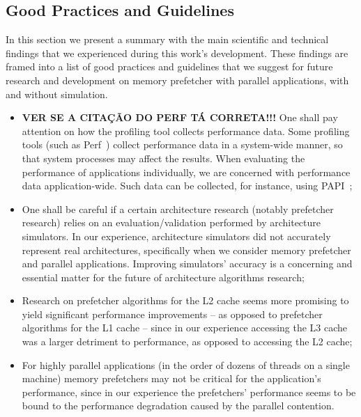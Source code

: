 \documentclass[AMA,final,STIX1COL]{WileyNJD-v2}
\begin{document}
\subsection{Good Practices and Guidelines}
In this section we present a summary with the main scientific and technical findings that we experienced during this work's development. These findings are framed into a list of good practices and guidelines that we suggest for future research and development on memory prefetcher with parallel applications, with and without simulation.

\begin{itemize}
    \item \textbf{VER SE A CITAÇÃO DO PERF TÁ CORRETA!!!} One shall pay attention on how the profiling tool collects performance data. Some profiling tools (such as Perf~\cite{de2010new}) collect performance data in a system-wide manner, so that system processes may affect the results. When evaluating the performance of applications individually, we are concerned with performance data application-wide. Such data can be collected, for instance, using PAPI~\cite{terpstra2010papi};
    
    \item One shall be careful if a certain architecture research (notably prefetcher research) relies on an evaluation/validation performed by architecture simulators. In our experience, architecture simulators did not accurately represent real architectures, specifically when we consider memory prefetcher and parallel applications. Improving simulators' accuracy is a concerning and essential matter for the future of architecture algorithms research;
    
    \item Research on prefetcher algorithms for the L2 cache seems more promising to yield significant performance improvements -- as opposed to prefetcher algorithms for the L1 cache -- since in our experience accessing the L3 cache was a larger detriment to performance, as opposed to accessing the L2 cache;
    
    \item For highly parallel applications (in the order of dozens of threads on a single machine) memory prefetchers may not be critical for the application's performance, since in our experience the prefetchers' performance seems to be bound to the performance degradation caused by the parallel contention.
\end{itemize}
\end{document}

